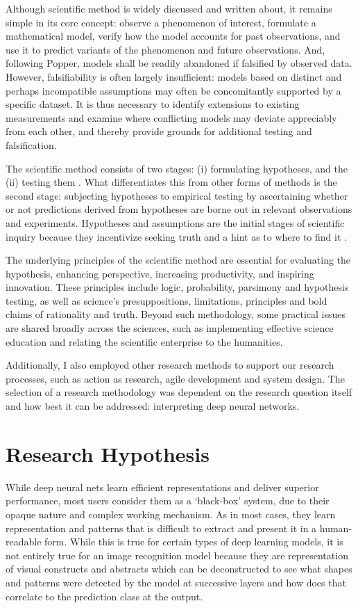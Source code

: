 Although scientific method \cite{2016397} is widely discussed and written about, it remains simple in its core concept: observe a phenomenon of interest, formulate a mathematical model, verify how the model accounts for past observations, and use it to predict variants of the phenomenon and future observations. And, following Popper, models shall be readily abandoned if falsified by observed data. However, falsifiability is often largely insufficient: models based on distinct and perhaps incompatible assumptions may often be concomitantly supported by a specific dataset. It is thus necessary to identify extensions to existing measurements and examine where conflicting models may deviate appreciably from each other, and thereby provide grounds for additional testing and falsification.

The scientific method consists of two stages: (i) formulating hypotheses, and the (ii) testing them \cite{2016397}. What differentiates this from other forms of methods is the second stage: subjecting hypotheses to empirical testing by ascertaining whether or not predictions derived from hypotheses are borne out in relevant observations and experiments. Hypotheses and assumptions are the initial stages of scientific inquiry because they incentivize seeking truth and a hint as to where to find it \cite{AYALA2016xi}.

The underlying principles of the scientific method \cite{gauch_jr_2012} are essential for evaluating the hypothesis, enhancing perspective, increasing productivity, and inspiring innovation. These principles include logic, probability, parsimony and hypothesis testing, as well as science's presuppositions, limitations, principles and bold claims of rationality and truth. Beyond such methodology, some practical issues are shared broadly across the sciences, such as implementing effective science education and relating the scientific enterprise to the humanities.

Additionally, I also employed other research methods to support our research processes, such as action as research, agile development and system design. The selection of a research methodology was dependent on the research question itself and how best it can be addressed: interpreting deep neural networks.

\section{Research Hypothesis}

While deep neural nets learn efficient representations and deliver superior performance, most users consider them as a ‘black-box’ system, due to their opaque nature and complex working mechanism. As in most cases, they learn representation and patterns that is difficult to extract and present it in a human-readable form. While this is true for certain types of deep learning models, it is not entirely true for an image recognition model because they are representation of visual constructs and abstracts which can be deconstructed to see what shapes and patterns were detected by the model at successive layers \cite{Zeiler} and how does that correlate to the prediction class at the output.

